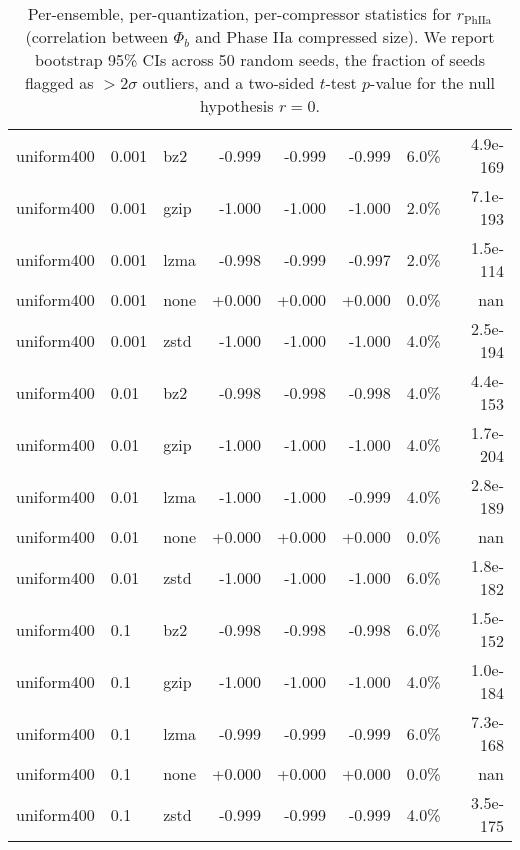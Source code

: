 \begin{table}[h!]
\begin{tabular}{l l l r r r r r}
\midrule
uniform400 & 0.001 & bz2 & -0.999 & -0.999 & -0.999 & 6.0\% & 4.9e-169\\
uniform400 & 0.001 & gzip & -1.000 & -1.000 & -1.000 & 2.0\% & 7.1e-193\\
uniform400 & 0.001 & lzma & -0.998 & -0.999 & -0.997 & 2.0\% & 1.5e-114\\
uniform400 & 0.001 & none & +0.000 & +0.000 & +0.000 & 0.0\% & nan\\
uniform400 & 0.001 & zstd & -1.000 & -1.000 & -1.000 & 4.0\% & 2.5e-194\\
\midrule
uniform400 & 0.01 & bz2 & -0.998 & -0.998 & -0.998 & 4.0\% & 4.4e-153\\
uniform400 & 0.01 & gzip & -1.000 & -1.000 & -1.000 & 4.0\% & 1.7e-204\\
uniform400 & 0.01 & lzma & -1.000 & -1.000 & -0.999 & 4.0\% & 2.8e-189\\
uniform400 & 0.01 & none & +0.000 & +0.000 & +0.000 & 0.0\% & nan\\
uniform400 & 0.01 & zstd & -1.000 & -1.000 & -1.000 & 6.0\% & 1.8e-182\\
\midrule
uniform400 & 0.1 & bz2 & -0.998 & -0.998 & -0.998 & 6.0\% & 1.5e-152\\
uniform400 & 0.1 & gzip & -1.000 & -1.000 & -1.000 & 4.0\% & 1.0e-184\\
uniform400 & 0.1 & lzma & -0.999 & -0.999 & -0.999 & 6.0\% & 7.3e-168\\
uniform400 & 0.1 & none & +0.000 & +0.000 & +0.000 & 0.0\% & nan\\
uniform400 & 0.1 & zstd & -0.999 & -0.999 & -0.999 & 4.0\% & 3.5e-175\\
\midrule
\bottomrule
\end{tabular}
\caption{Per-ensemble, per-quantization, per-compressor statistics for $r_{\text{PhIIa}}$ (correlation between $\Phi_b$ and Phase IIa compressed size). We report bootstrap 95\% CIs across 50 random seeds, the fraction of seeds flagged as $>2\sigma$ outliers, and a two-sided $t$-test $p$-value for the null hypothesis $r=0$.}
\label{tab:phase2a_stats}
\end{table}